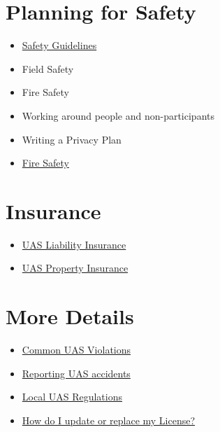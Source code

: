\documentclass[
]{book}
\providecommand{\tightlist}{%
  \setlength{\itemsep}{0pt}\setlength{\parskip}{0pt}}
\begin{document}
\hypertarget{planning-for-safety}{%
\section*{Planning for Safety}\label{planning-for-safety}}

\begin{itemize}
\tightlist
\item
  \protect\hyperlink{ch-safety-guidelines}{Safety Guidelines}
\item
  Field Safety
\item
  Fire Safety
\item
  Working around people and non-participants
\item
  Writing a Privacy Plan
\item
  \protect\hyperlink{ch-fire-safety}{Fire Safety}
\end{itemize}

\hypertarget{insurance}{%
\section*{Insurance}\label{insurance}}

\begin{itemize}
\tightlist
\item
  \protect\hyperlink{ch-liability-insurance}{UAS Liability Insurance}
\item
  \protect\hyperlink{ch-hull-insurance}{UAS Property Insurance}
\end{itemize}

\hypertarget{more-details}{%
\section*{More Details}\label{more-details}}

\begin{itemize}
\tightlist
\item
  \protect\hyperlink{ch-common-UAS-violations}{Common UAS Violations}
\item
  \protect\hyperlink{ch-uas-accident}{Reporting UAS accidents}
\item
  \protect\hyperlink{ch-local-UAS-regulations}{Local UAS Regulations}
\item
  \protect\hyperlink{ch-replace-license}{How do I update or replace my License?}
\end{itemize}
\end{document}
